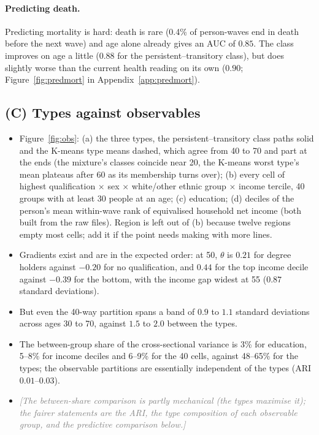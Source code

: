 \documentclass[11pt]{article}
\newcommand{\note}[1]{\textcolor{gray}{\textit{[#1]}}}
\begin{document}
	\paragraph{Predicting death.} Predicting mortality is hard: death is rare (0.4\% of person-waves end in death before the next wave) and age alone already gives an AUC of $0.85$. The class improves on age a little ($0.88$ for the persistent--transitory class), but does slightly worse than the current health reading on its own ($0.90$; Figure~\ref{fig:predmort} in Appendix~\ref{app:predmort}).

	\subsection{(C) Types against observables}
	\label{sec:observables}
	
	\begin{itemize}
		\item Figure~\ref{fig:obs}: (a) the three types, the persistent--transitory class paths solid and the K-means type means dashed, which agree from 40 to 70 and part at the ends (the mixture's classes coincide near 20, the K-means worst type's mean plateaus after 60 as its membership turns over); (b) every cell of highest qualification $\times$ sex $\times$ white/other ethnic group $\times$ income tercile, 40 groups with at least 30 people at an age; (c) education; (d) deciles of the person's mean within-wave rank of equivalised household net income (both built from the raw files). Region is left out of (b) because twelve regions empty most cells; add it if the point needs making with more lines.
		\item Gradients exist and are in the expected order: at 50, $\theta$ is $0.21$ for degree holders against $-0.20$ for no qualification, and $0.44$ for the top income decile against $-0.39$ for the bottom, with the income gap widest at 55 ($0.87$ standard deviations).
		\item But even the 40-way partition spans a band of $0.9$ to $1.1$ standard deviations across ages 30 to 70, against $1.5$ to $2.0$ between the types.
		\item The between-group share of the cross-sectional variance is 3\% for education, 5--8\% for income deciles and 6--9\% for the 40 cells, against 48--65\% for the types; the observable partitions are essentially independent of the types (ARI $0.01$--$0.03$).
		\item \note{The between-share comparison is partly mechanical (the types maximise it); the fairer statements are the ARI, the type composition of each observable group, and the predictive comparison below.}
	\end{itemize}
	
\end{document}
